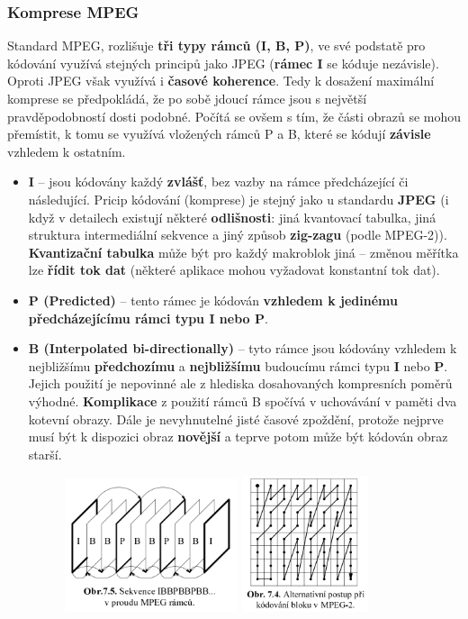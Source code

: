 \subsubsection{Komprese MPEG}
Standard MPEG, rozlišuje \textbf{tři typy rámců (I, B, P)},  ve své podstatě pro kódování využívá stejných principů jako JPEG (\textbf{rámec I} se kóduje nezávisle). Oproti JPEG však využívá i \textbf{časové koherence}. Tedy k dosažení maximální komprese se předpokládá, že po sobě jdoucí rámce jsou s největší pravděpodobností dosti podobné. Počítá se ovšem s tím, že části obrazů se mohou přemístit, k tomu se využívá vložených rámců P a B, které se kódují \textbf{závisle} vzhledem k ostatním.
\begin{itemize}
\item \textbf{I} -- jsou kódovány každý \textbf{zvlášť}, bez vazby na rámce předcházející či následující. Pricip kódování (komprese) je stejný jako u standardu \textbf{JPEG} (i když v detailech existují některé \textbf{odlišnosti}: jiná kvantovací tabulka, jiná struktura intermediální sekvence a jiný způsob \textbf{zig-zagu} (podle MPEG-2)). \textbf{Kvantizační tabulka} může být pro každý makroblok jiná -- změnou měřítka lze \textbf{řídit tok dat} (některé aplikace mohou vyžadovat konstantní tok dat).
\item \textbf{P (Predicted)} -- tento rámec je kódován \textbf{vzhledem k jedinému předcházejícímu rámci typu I nebo P}. 
\item \textbf{B (Interpolated bi-directionally)} -- tyto rámce jsou kódovány vzhledem k nejbližšímu \textbf{předchozímu} a \textbf{nejbližšímu} budoucímu rámci typu \textbf{I} nebo \textbf{P}. Jejich použití je nepovinné ale z hlediska dosahovaných kompresních poměrů výhodné. \textbf{Komplikace} z použití rámců B spočívá v uchovávání v paměti dva kotevní obrazy. Dále je nevyhnutelné jisté časové zpoždění, protože nejprve musí být k dispozici obraz \textbf{novější} a teprve potom může být kódován obraz starší.
\begin{figure}[H]
	\centering
	\includegraphics[width=0.48\textwidth]{assets/7_mpeg_komprese}
	\includegraphics[width=0.35\textwidth]{assets/7_mpeg_zigzag}
\end{figure}
\end{itemize}

